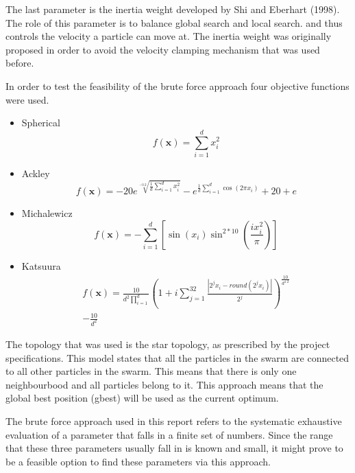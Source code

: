 \documentclass[hidelinks,english,conference]{IEEEtran}
\begin{document}
The last parameter is the inertia weight developed by Shi and Eberhart (1998). The role of this parameter is to balance global search and local search. \cite{shi1998modified} and thus controls the velocity a particle can move at. The inertia weight was originally proposed in order to avoid the velocity clamping mechanism that was used before.

In order to test the feasibility of the brute force approach four objective functions were used. 
\begin{itemize}
	\item Spherical
		\begin{equation}\label{sphericalEquation}
			f(\textbf{x})=\sum_{i=1}^{d}x_{i}^{2}
		\end{equation}
	\item Ackley\\ 
		\begin{equation}\label{ackleyEquation}
			f(\textbf{x})=-20e^{\sqrt[-0.2]{\frac{1}{d}\sum_{i=1}^{d}x_{i}^{2}}}-e^{\frac{1}{d}\sum_{i=1}^{d}\cos(2\pi x_{i})}+20+e
		\end{equation}
	\item Michalewicz\\
		\begin{equation}\label{michalewiczEquation}
			f(\textbf{x})=-\sum_{i=1}^{d}[\sin(x_i)\sin^{2*10}(\frac{ix_{i}^{2}}{\pi})]
		\end{equation}
	\item Katsuura\\
		\begin{equation}\label{katsuuraEquation}
			\begin{split}
			f(\textbf{x})=\frac{10}{d^{2}\prod_{i=1}^{d}}(1+i\sum_{j=1}^{32}\frac{\left|2^{j}x_{i}-round(2^{j}x_{i})\right|}{2^{j}})^{\frac{10}{d^{1.2}}}\\-\frac{10}{d^{2}}
			\end{split}
		\end{equation}
\end{itemize}

The topology that was used is the star topology, as prescribed by the project specifications. This model states that all the particles in the swarm are connected to all other particles in the swarm. This means that there is only one neighbourbood and all particles belong to it. This approach means that the global best position (gbest) will be used as the current optimum.

The brute force approach used in this report refers to the systematic exhaustive evaluation of a parameter that falls in a finite set of numbers. Since the range that these three parameters usually fall in is known and small, it might prove to be a feasible option to find these parameters via this approach.
\end{document}
